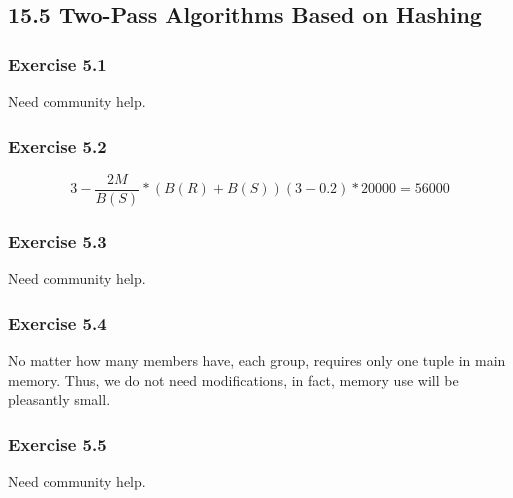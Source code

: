 \documentclass[../../main.tex]{subfiles}
\begin{document}
\subsection{15.5 Two-Pass Algorithms Based on Hashing}

\subsubsection*{Exercise 5.1}

Need community help.

\subsubsection*{Exercise 5.2}

$$
3 - \frac{2M}{B(S)} * (B(R) + B(S))(3 - 0.2) * 20000 = 56000
$$

\subsubsection*{Exercise 5.3}

Need community help.

\subsubsection*{Exercise 5.4}

No matter how many members have, each group, requires only one tuple
in main memory. Thus, we do not need modifications, in fact, memory use
will be pleasantly small.

\subsubsection*{Exercise 5.5}

Need community help.
\end{document}
